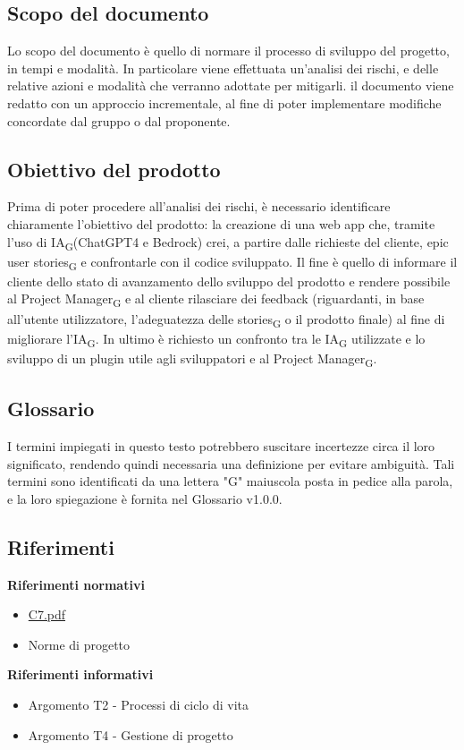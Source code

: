\documentclass{article}
\begin{document}
\subsection{Scopo del documento}
Lo scopo del documento è quello di normare il processo di sviluppo del progetto, in tempi e modalità. In particolare viene effettuata un'analisi dei rischi, e delle relative azioni e modalità che verranno adottate per mitigarli. il documento viene redatto con un approccio incrementale, al fine di poter implementare modifiche concordate dal gruppo o dal proponente.

\subsection{Obiettivo del prodotto}
Prima di poter procedere all'analisi dei rischi, è necessario identificare chiaramente l'obiettivo del prodotto: la creazione di una web app che, tramite l’uso di IA\textsubscript{G}(ChatGPT4 e Bedrock) crei, a partire dalle richieste del cliente, epic user stories\textsubscript{G} e confrontarle con il codice sviluppato. Il fine è quello di informare il cliente dello stato di avanzamento dello sviluppo del prodotto e rendere possibile al Project Manager\textsubscript{G} e al cliente rilasciare dei
feedback (riguardanti, in base all'utente utilizzatore, l'adeguatezza delle stories\textsubscript{G} o il prodotto finale) al fine di migliorare l’IA\textsubscript{G}. In ultimo è richiesto un confronto tra le IA\textsubscript{G} utilizzate e lo sviluppo di un plugin utile agli sviluppatori e al Project Manager\textsubscript{G}.

\subsection{Glossario}
I termini impiegati in questo testo potrebbero suscitare incertezze circa il loro significato, rendendo quindi necessaria una definizione per evitare ambiguità. Tali termini sono identificati da una lettera "G" maiuscola posta in pedice alla parola, e la loro spiegazione è fornita nel Glossario v1.0.0.

\subsection{Riferimenti}
\textbf{Riferimenti normativi}
\begin{itemize}
        \item \href{https://www.math.unipd.it/~tullio/IS-1/2023/Progetto/C7.pdf}{C7.pdf}
        \item{Norme di progetto}
\end{itemize}
\textbf{Riferimenti informativi}
\begin{itemize}
        \item Argomento T2 - Processi di ciclo di vita
        \item Argomento T4 - Gestione di progetto
\end{itemize}
\end{document}
